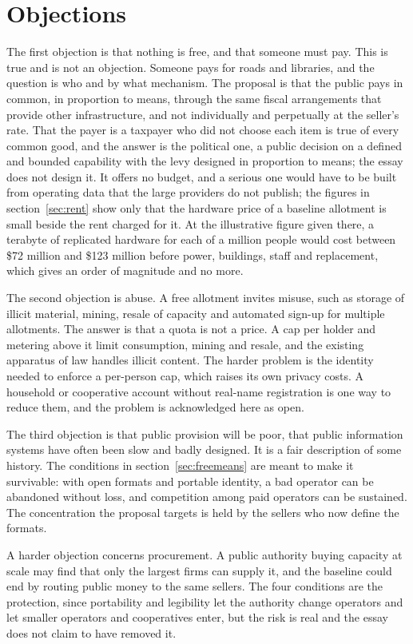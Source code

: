 \documentclass[12pt]{article}
\begin{document}
\section{Objections}

The first objection is that nothing is free, and that someone must pay. This is true and is not an objection. Someone pays for roads and libraries, and the question is who and by what mechanism. The proposal is that the public pays in common, in proportion to means, through the same fiscal arrangements that provide other infrastructure, and not individually and perpetually at the seller's rate. That the payer is a taxpayer who did not choose each item is true of every common good, and the answer is the political one, a public decision on a defined and bounded capability with the levy designed in proportion to means; the essay does not design it. It offers no budget, and a serious one would have to be built from operating data that the large providers do not publish; the figures in section~\ref{sec:rent} show only that the hardware price of a baseline allotment is small beside the rent charged for it. At the illustrative figure given there, a terabyte of replicated hardware for each of a million people would cost between \$72 million and \$123 million before power, buildings, staff and replacement, which gives an order of magnitude and no more.

The second objection is abuse. A free allotment invites misuse, such as storage of illicit material, mining, resale of capacity and automated sign-up for multiple allotments. The answer is that a quota is not a price. A cap per holder and metering above it limit consumption, mining and resale, and the existing apparatus of law handles illicit content. The harder problem is the identity needed to enforce a per-person cap, which raises its own privacy costs. A household or cooperative account without real-name registration is one way to reduce them, and the problem is acknowledged here as open.

The third objection is that public provision will be poor, that public information systems have often been slow and badly designed. It is a fair description of some history. The conditions in section~\ref{sec:freemeans} are meant to make it survivable: with open formats and portable identity, a bad operator can be abandoned without loss, and competition among paid operators can be sustained. The concentration the proposal targets is held by the sellers who now define the formats.

A harder objection concerns procurement. A public authority buying capacity at scale may find that only the largest firms can supply it, and the baseline could end by routing public money to the same sellers. The four conditions are the protection, since portability and legibility let the authority change operators and let smaller operators and cooperatives enter, but the risk is real and the essay does not claim to have removed it.
\end{document}
